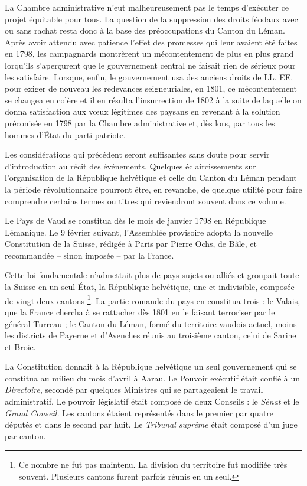 \documentclass[french,twoside]{book} %
\begin{document}
La Chambre administrative n’eut malheureusement pas le temps d’exécuter ce projet équitable pour tous. La question de la suppression des droits féodaux avec ou sans rachat resta donc à la base des préoccupations du Canton du Léman. Après avoir attendu avec patience l’effet des promesses qui leur avaient été faites en 1798, les campagnards montrèrent un mécontentement de plus en plus grand lorqu’ils s’aperçurent que le gouvernement central ne faisait rien de sérieux pour les satisfaire. Lorsque, enfin, le gouvernement usa des anciens droits de LL. EE. pour exiger de nouveau les redevances seigneuriales, en 1801, ce mécontentement se changea en colère et il en résulta l’insurrection de 1802 à la suite de laquelle on donna satisfaction aux vœux légitimes des paysans en revenant à la solution préconisée en 1798 par la Chambre administrative et, dès lors, par tous les hommes d’État du parti patriote.\par
Les considérations qui précédent seront suffisantes sans doute pour servir d’introduction au récit des événements. Quelques éclaircissements sur l’organisation de la République helvétique et celle du Canton du Léman pendant la période révolutionnaire pourront être, en revanche, de quelque utilité pour faire comprendre certains termes ou titres qui reviendront souvent dans ce volume.\par
Le Pays de Vaud se constitua dès le mois de janvier 1798 en République Lémanique. Le 9 février suivant, l’Assemblée provisoire adopta la nouvelle Constitution de la Suisse, rédigée à Paris par Pierre Ochs, de Bâle, et recommandée – sinon imposée – par la France.\par
Cette loi fondamentale n’admettait plus de pays sujets ou alliés et groupait toute la Suisse en un seul État, la République helvétique, une et indivisible, composée de vingt-deux cantons \footnote{Ce nombre ne fut pas maintenu. La division du territoire fut modifiée très souvent. Plusieurs cantons furent parfois réunis en un seul.}. La partie romande du pays en constitua trois : le Valais, que la France chercha à se rattacher dès 1801 en le faisant terroriser par le général Turreau ; le Canton du Léman, formé du territoire vaudois actuel, moins les districts de Payerne et d’Avenches réunis au troisième canton, celui de Sarine et Broie.\par
La Constitution donnait à la République helvétique un seul gouvernement qui se constitua au milieu du mois d’avril à Aarau. Le Pouvoir exécutif était confié à un \emph{Directoire}, secondé par quelques Ministres qui se partageaient le travail administratif. Le pouvoir législatif était composé de deux Conseils : le \emph{Sénat} et le \emph{Grand Conseil.} Les cantons étaient représentés dans le premier par quatre députés et dans le second par huit. Le \emph{Tribunal suprême} était composé d’un juge par canton.\par
\end{document}
